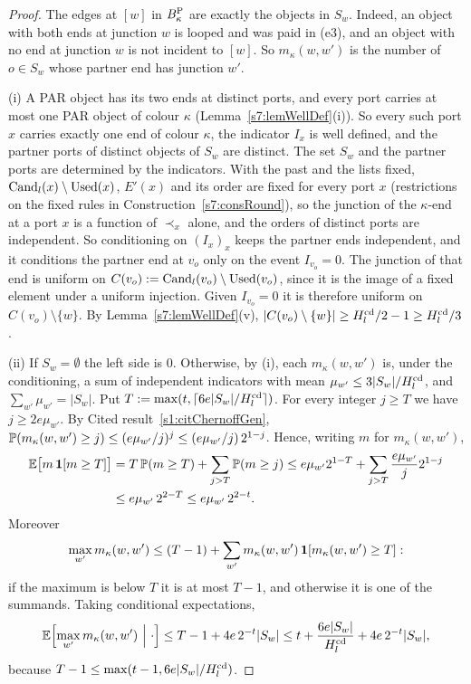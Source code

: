 \begin{proof}
The edges at $[w]$ in $B^{\mathrm{P}}_\kappa$ are exactly the objects in $S_w$. Indeed, an
object with both ends at junction $w$ is looped and was paid in (e3), and an
object with no end at junction $w$ is not incident to $[w]$. So
$m_\kappa(w,w')$ is the number of $o\in S_w$ whose partner end has junction
$w'$.

(i) A PAR object has its two ends at distinct ports, and every port carries at
most one PAR object of colour $\kappa$ (Lemma~\ref{s7:lemWellDef}(i)). So every
such port $x$ carries exactly one end of colour $\kappa$, the indicator $I_x$ is
well defined, and the partner ports of distinct objects of $S_w$ are distinct.
The set $S_w$ and the partner ports are determined by the indicators. With the
past and the lists fixed, $\mathrm{Cand}_l(x)\setminus\mathrm{Used}(x)$, $E'(x)$ and its order
are fixed for every port $x$ (restrictions on the fixed rules in
Construction~\ref{s7:consRound}), so the junction of the $\kappa$-end at a
port $x$ is a function of $\prec_x$ alone, and the orders of distinct ports are independent.
So conditioning on $(I_x)_x$ keeps the partner ends independent, and it
conditions the partner end at $v_o$ only on the event $I_{v_o}=0$. The junction
of that end is uniform on $C(v_o)\mathrel{:=}\mathrm{Cand}_l(v_o)\setminus\mathrm{Used}(v_o)$, since
it is the image of a fixed element under a uniform injection. Given $I_{v_o}=0$
it is therefore uniform on $C(v_o)\setminus\{w\}$. By
Lemma~\ref{s7:lemWellDef}(v), $|C(v_o)\setminus\{w\}|\ge H^{\mathrm{cd}}_l/2-1\ge H^{\mathrm{cd}}_l/3$.

(ii) If $S_w=\emptyset$ the left side is $0$. Otherwise, by (i), each
$m_\kappa(w,w')$ is, under the conditioning, a sum of independent indicators
with mean $\mu_{w'}\le3|S_w|/H^{\mathrm{cd}}_l$, and $\sum_{w'}\mu_{w'}=|S_w|$. Put
$T\mathrel{:=}\max(t,\lceil6e|S_w|/H^{\mathrm{cd}}_l\rceil)$. For every integer $j\ge T$ we have
$j\ge2e\mu_{w'}$. By Cited result~\ref{s1:citChernoffGen},
$\mathbb{P}(m_\kappa(w,w')\ge j)\le(e\mu_{w'}/j)^j\le(e\mu_{w'}/j)\,2^{1-j}$. Hence,
writing $m$ for $m_\kappa(w,w')$,
\begin{align*}
\mathbb{E}\bigl[m\,\mathbf{1}[m\ge T]\bigr]
&=T\,\mathbb{P}(m\ge T)+\sum_{j>T}\mathbb{P}(m\ge j)
\le e\mu_{w'}2^{1-T}+\sum_{j>T}\frac{e\mu_{w'}}{j}2^{1-j}\\
&\le e\mu_{w'}\,2^{2-T}\le e\mu_{w'}\,2^{2-t}.
\end{align*}
Moreover
\[
\max_{w'}m_\kappa(w,w')\le(T-1)+\sum_{w'}m_\kappa(w,w')\,\mathbf{1}[m_\kappa(w,w')\ge T]:
\]
if the maximum is below $T$ it is at most $T-1$, and otherwise it is one of the
summands. Taking conditional expectations,
\[
\Ex\Bigl[\max_{w'}m_\kappa(w,w')\ \Big|\ \cdot\Bigr]\le T-1+4e\,2^{-t}|S_w|
\le t+\frac{6e|S_w|}{\Hcd_l}+4e\,2^{-t}|S_w|,
\]
because $T-1\le\max(t-1,6e|S_w|/H^{\mathrm{cd}}_l)$.


\end{proof}
